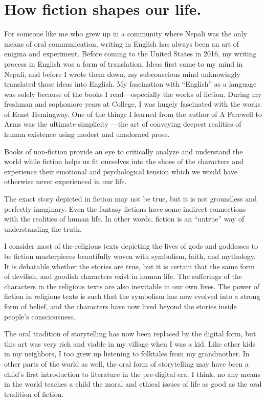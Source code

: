 \documentclass[oneside,12pt]{book}
\begin{document}
\section*{How fiction shapes our life.}
For someone like me who grew up in a community where Nepali was the only means of oral communication, writing in English has always been an art of enigma and experiment. Before coming to the United States in 2016, my writing process in English was a form of translation. Ideas first came to my mind in Nepali, and before I wrote them down, my subconscious mind unknowingly translated those ideas into English. 
My fascination with “English” as a language was solely because of the books I read—especially the works of fiction. During my freshman and sophomore years at College, I was hugely fascinated with the works of Ernst Hemingway. One of the things I learned from the author of A Farewell to Arms was the ultimate simplicity —the art of conveying deepest realities of human existence using modest and unadorned prose.  

Books of non-fiction provide an eye to critically analyze and understand the world while fiction helps us fit ourselves into the shoes of the characters and experience their emotional and psychological tension which we would have otherwise never experienced in our life.

The exact story depicted in fiction may not be true, but it is not groundless and perfectly imaginary. Even the fantasy fictions have some indirect connections with the realities of human life. In other words, fiction is an “untrue” way of understanding the truth. 

I consider most of the religious texts depicting the lives of gods and goddesses to be fiction masterpieces beautifully woven with symbolism, faith, and mythology. It is debatable whether the stories are true, but it is certain that the same form of devilish, and goodish characters exist in human life. The sufferings of the characters in the religious texts are also inevitable in our own lives. The power of fiction in religious texts is such that the symbolism has now evolved into a strong form of belief, and the characters have now lived beyond the stories inside people’s consciousness. 

The oral tradition of storytelling has now been replaced by the digital form, but this art was very rich and viable in my village when I was a kid. Like other kids in my neighbors, I too grew up listening to folktales from my grandmother. In other parts of the world as well, the oral form of storytelling may have been a child’s first introduction to literature in the pre-digital era. I think, no any means in the world teaches a child the moral and ethical issues of life as good as the oral tradition of fiction. 
\end{document}
